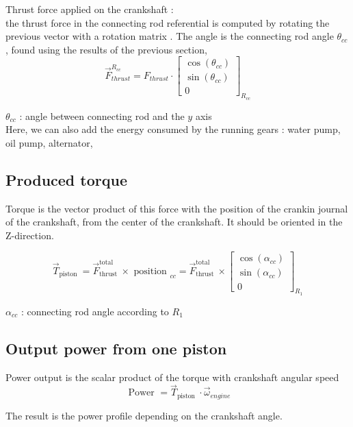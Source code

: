 \documentclass[12pt,a4paper]{article}
\begin{document}
	Thrust force applied on the crankshaft : \\
	the thrust force in the connecting rod referential is computed by rotating the previous vector with a rotation matrix . The angle is the connecting rod angle $\theta_{cc}$, found using the results of the previous section, 
	\[
	\vec{F}_{thrust}^{R_{c c}}=F_{thrust} \cdot\left[\begin{array}{c}
		\cos \left(\theta_{c c}\right)  \tag{5}\\
		\sin \left(\theta_{c c}\right) \\
		0
	\end{array}\right]_{R_{c c}}
	\]
	
	$\theta_{c c}$ : angle between connecting rod and the $y$ axis\\
	
		
		Here, we can also add the energy consumed by the running gears : water pump, oil pump, alternator,\\
	\subsection{Produced torque}
	Torque is the vector product of this force with the position of the crankin journal of the crankshaft,  from the center of the crankshaft. It should be oriented in the Z-direction.
		
		\[
		\vec{T}_{\text {piston }}=\vec{F}_{\text {thrust }}^{\text {total }} \times \text { position }_{c c}=\vec{F}_{\text {thrust }}^{\text {total }} \times\left[\begin{array}{c}
			\cos \left(\alpha_{c c}\right)  \tag{7}\\
			\sin \left(\alpha_{c c}\right) \\
			0
		\end{array}\right]_{R_{1}}
		\]
		
		$\alpha_{c c}$ : connecting rod angle according to $R_{1}$\\
	\subsection{Output power from one piston}
	Power output is the scalar product of the torque with crankshaft angular speed
	\begin{equation*}
		\text { Power }=\vec{T}_{\text {piston }} \cdot \vec{\omega}_{engine} \tag{8}
	\end{equation*}
	
	The result is the power profile depending on the crankshaft angle.
		
\end{document}

